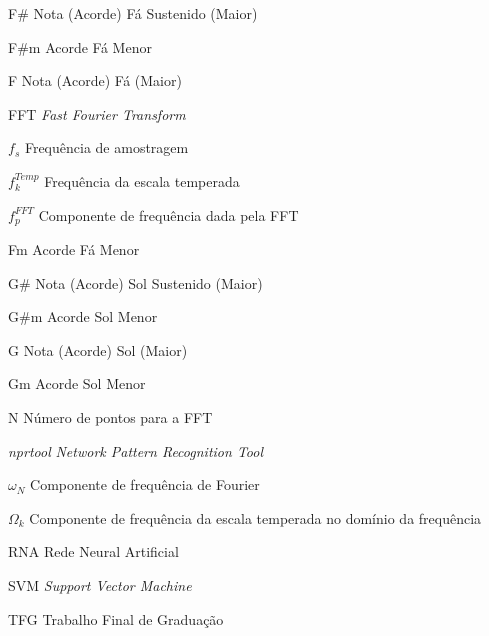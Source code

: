 \begin{siglas}
  \item[F\#]   Nota (Acorde) Fá Sustenido (Maior)
  \item[F\#m]  Acorde Fá Menor
  \item[F]     Nota (Acorde) Fá (Maior)
  \item[FFT]   \textit{Fast Fourier Transform}
  \item[$f_s$] Frequência de amostragem
  \item[$f^{Temp}_k$] Frequência da escala temperada
  \item[$f^{FFT}_p$] Componente de frequência dada pela FFT
  \item[Fm]    Acorde Fá Menor
  \item[G\#]   Nota (Acorde) Sol Sustenido (Maior)
  \item[G\#m]  Acorde Sol Menor
  \item[G]     Nota (Acorde) Sol (Maior)
  \item[Gm]    Acorde Sol Menor
  \item[N]     Número de pontos para a FFT
  \item[\textit{nprtool}] \textit{Network Pattern Recognition Tool}
  \item[$\omega{_N}$] Componente de frequência de Fourier
  \item[$\Omega{_k}$] Componente de frequência da escala temperada no domínio da frequência
  \item[RNA]   Rede Neural Artificial
  \item[SVM] \textit{Support Vector Machine}
  \item[TFG]   Trabalho Final de Graduação

\end{siglas}


